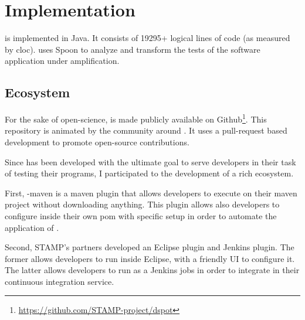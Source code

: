 \section{Implementation}
\label{sec:dspot:implemention}

\dspot is implemented in Java.
It consists of 19295+ logical lines of code (as measured by cloc).
\dspot uses Spoon\cite{pawlak:hal-01169705} to analyze and transform the tests of the software application under amplification.

\subsection{Ecosystem}
\label{subsec:dspot:implemention:ecosystem}

For the sake of open-science, \dspot is made publicly available on Github\footnote{\url{https://github.com/STAMP-project/dspot}}.
This repository is animated by the community around \dspot.
It uses a pull-request based development to promote open-source contributions.

Since \dspot has been developed with the ultimate goal to serve developers in their task of testing their programs, I participated to the development of a rich ecosystem.

First, \dspot-maven is a maven plugin that allows developers to execute \dspot on their maven project without downloading anything.
This plugin allows also developers to configure \dspot inside their own pom with specific setup in order to automate the application of \dspot.

Second, STAMP's partners developed an Eclipse plugin and Jenkins plugin. 
The former allows developers to run \dspot inside Eclipse, with a friendly UI to configure it. 
The latter allows developers to run \dspot as a Jenkins jobs in order to integrate \dspot in their continuous integration service.